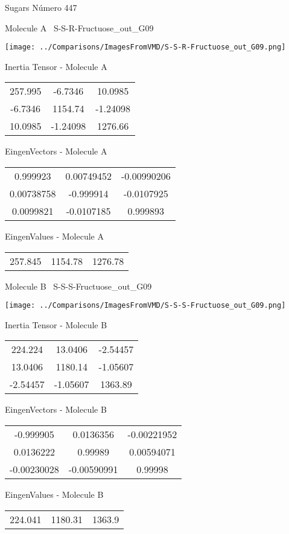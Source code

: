 \vtab[-3cm]
\begin{center}
{\large Sugars \tab Número 447}
\end{center}
\begin{multicols}{2}
\begin{center}

Molecule A \
S-S-R-Fructuose\_out\_G09

\texttt{[image: ../Comparisons/ImagesFromVMD/S-S-R-Fructuose\_out\_G09.png]}

Inertia Tensor - Molecule A \\
\begin{tabular}{|c c c|}
257.995	 & 	-6.7346	 & 	10.0985	 \\
-6.7346	 & 	1154.74	 & 	-1.24098	 \\
10.0985	 & 	-1.24098	 & 	1276.66
\end{tabular}

\vtab
 EingenVectors - Molecule A     \\
\begin{tabular}{|c c c|}
0.999923	 & 	0.00749452	 & 	-0.00990206	 \\
0.00738758	 & 	-0.999914	 & 	-0.0107925	 \\
0.0099821	 & 	-0.0107185	 & 	0.999893
\end{tabular}

\vtab
 EingenValues - Molecule A     \\
\begin{tabular}{|c c c|}
257.845	 & 	1154.78	 & 	1276.78	 \\
\end{tabular}
\columnbreak

Molecule B \
S-S-S-Fructuose\_out\_G09

\texttt{[image: ../Comparisons/ImagesFromVMD/S-S-S-Fructuose\_out\_G09.png]}

Inertia Tensor - Molecule B \\
\begin{tabular}{|c c c|}
224.224	 & 	13.0406	 & 	-2.54457	 \\
13.0406	 & 	1180.14	 & 	-1.05607	 \\
-2.54457	 & 	-1.05607	 & 	1363.89
\end{tabular}

\vtab
 EingenVectors - Molecule B     \\
\begin{tabular}{|c c c|}
-0.999905	 & 	0.0136356	 & 	-0.00221952	 \\
0.0136222	 & 	0.99989	 & 	0.00594071	 \\
-0.00230028	 & 	-0.00590991	 & 	0.99998
\end{tabular}

\vtab
 EingenValues - Molecule B     \\
\begin{tabular}{|c c c|}
224.041	 & 	1180.31	 & 	1363.9	 \\
\end{tabular}

\end{center}
\end{multicols}

